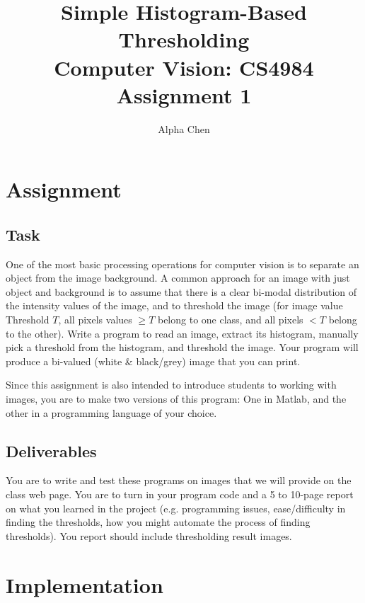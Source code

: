 \documentclass[11pt]{article}
\begin{document}
\title{Simple Histogram-Based Thresholding \\ Computer Vision: CS4984 Assignment 1}
\author{Alpha Chen}

\maketitle

\section{Assignment}

\subsection{Task}

One of the most basic processing operations for computer vision is to separate an object from 
the image background.  A common approach for an image with just object and background is 
to assume that there is a clear bi-modal distribution of the intensity values of the image, and to 
threshold the image (for image value Threshold $T$, all pixels values $\geq T$ belong to one class, 
and all pixels $< T$ belong to the other).  Write a program to read an image, extract its 
histogram, manually pick a threshold from the histogram, and threshold the image. 
Your program will produce a bi-valued (white \& black/grey) image that you can 
print. 

Since this assignment is also intended to introduce students to working with images, 
you are to make two versions of this program: One in Matlab, and the other in a 
programming language of your choice. 

\subsection{Deliverables}

You are to write and test these programs on images that we will provide on the class web 
page.  You are to turn in your program code and a 5 to 10-page report on what you learned in 
the project (e.g. programming issues, ease/difficulty in finding the thresholds, how you might 
automate the process of finding thresholds).  You report should include thresholding result images. 

\section{Implementation}
\end{document}
